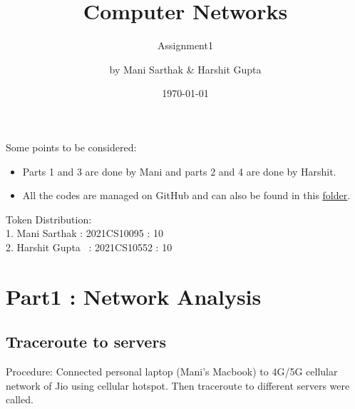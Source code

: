 \documentclass[11pt]{scrartcl}
\author{ by Mani Sarthak \& Harshit Gupta}
\date{\today}
\title{Computer Networks}
\subtitle{Assignment1}
\begin{document}
\maketitle

Some points to be considered:
\begin{itemize}
    \item Parts 1 and 3 are done by Mani and parts 2 and 4 are done by Harshit.
    \item All the codes are managed on GitHub and can also be found in this \href{https://drive.google.com/drive/folders/1QKKCJGQ5x3ZLXGFgR8Z5mXXcyV3pBJWg?usp=sharing}{\underline{folder}}. 
    

    
    
\end{itemize}

\vfill
\begin{center}
   Token Distribution:
\\
1. Mani Sarthak : 2021CS10095 : 10
\\
2. Harshit Gupta \ : 2021CS10552 : 10 
\end{center}




\newpage
\section{ Part1 : Network Analysis}
\subsection{Traceroute to servers}
Procedure: Connected personal laptop (Mani's Macbook) to 4G/5G cellular network of Jio using cellular hotspot. Then traceroute to different servers were called.
\end{document}

